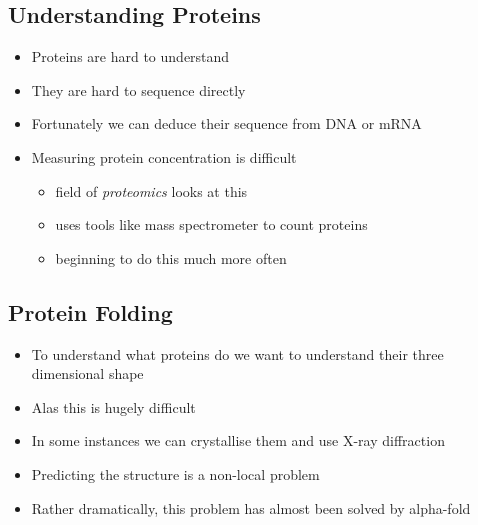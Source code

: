 \Outline %

\begin{slide}
\section{Understanding Proteins}

\begin{PauseHighLight}
  \begin{itemize}
  \item Proteins are hard to understand\pause
  \item They are hard to sequence directly\pause
  \item Fortunately we can deduce their sequence from DNA or mRNA\pause
  \item Measuring protein concentration is difficult
    \begin{itemize}
    \item field of \emph{proteomics} looks at this\pause
    \item uses tools like mass spectrometer to count proteins\pause
    \item beginning to do this much more often\pause
    \end{itemize}
  \end{itemize}
\end{PauseHighLight}

\end{slide}


\begin{slide}
\section{Protein Folding}

\begin{PauseHighLight}
  \begin{itemize}
  \item To understand what proteins do we want to understand their three
    dimensional shape\pause
  \item Alas this is hugely difficult\pause
  \item In some instances we can crystallise them and use X-ray
    diffraction\pause
  \item Predicting the structure is a non-local problem\pause
  \item Rather dramatically, this problem has almost been solved by
    alpha-fold\pauseb
  \end{itemize}
\end{PauseHighLight}

\end{slide}

